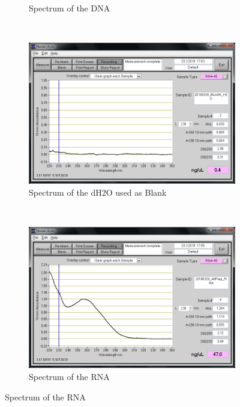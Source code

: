 \begin{figure}[H]
\begin{subfigure}[b]{0.49\textwidth}
        \caption{Spectrum of the DNA}
        \label{sfig:CJ20180320_AllPrep_DNA}
    \end{subfigure}
    \\
    \begin{subfigure}[b]{0.49\textwidth}
        \includegraphics[width=\textwidth]{graphics/screenshots/CJ20180320_BLANK_H2O.png}
        \caption{Spectrum of the dH2O used as Blank}
        \label{sfig:CJ20180320_BLANK_H2O}
    \end{subfigure}
    ~ 
    \begin{subfigure}[b]{0.49\textwidth}
        \includegraphics[width=\textwidth]{graphics/screenshots/CJ20180320_AllPrep_RNA.png}
        \caption{Spectrum of the RNA}
        \label{sfig:CJ20180320_AllPrep_RNA}
    \end{subfigure}
\end{figure}

